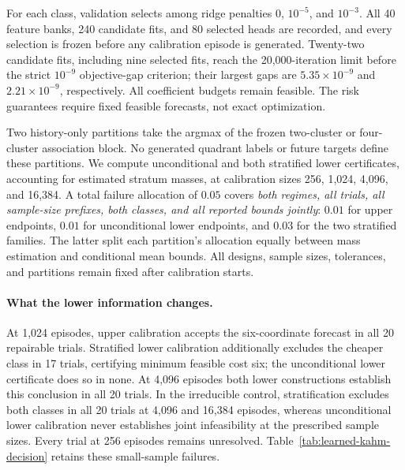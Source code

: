 For each class, validation selects among ridge penalties
$0$, $10^{-5}$, and $10^{-3}$. All 40 feature banks, 240 candidate fits, and
80 selected heads are recorded, and every selection is frozen before any
calibration episode is generated. Twenty-two candidate fits, including nine
selected fits, reach the 20,000-iteration limit before the strict $10^{-9}$
objective-gap criterion; their largest gaps are $5.35\times10^{-9}$ and
$2.21\times10^{-9}$, respectively. All coefficient budgets remain feasible.
The risk guarantees require fixed feasible forecasts, not exact optimization.

Two history-only partitions take the argmax of the frozen two-cluster or
four-cluster association block. No generated quadrant labels or future targets
define these partitions. We compute unconditional and both stratified lower
certificates, accounting for estimated stratum masses, at calibration sizes
256, 1,024, 4,096, and 16,384. A total failure allocation of $0.05$ covers
\emph{both regimes, all trials, all sample-size prefixes, both classes, and all
reported bounds jointly}: $0.01$ for upper endpoints, $0.01$ for unconditional
lower endpoints, and $0.03$ for the two stratified families. The latter split
each partition's allocation equally between mass estimation and conditional
mean bounds. All designs, sample sizes, tolerances, and partitions remain fixed
after calibration starts.



\paragraph{What the lower information changes.}
At 1,024 episodes, upper calibration accepts the six-coordinate forecast in
all 20 repairable trials. Stratified lower calibration additionally excludes
the cheaper class in 17 trials, certifying minimum feasible cost six; the
unconditional lower certificate does so in none. At 4,096 episodes both lower
constructions establish this conclusion in all 20 trials. In the irreducible
control, stratification excludes both classes in all 20 trials at 4,096 and
16,384 episodes, whereas unconditional lower calibration never establishes
joint infeasibility at the prescribed sample sizes. Every trial at 256
episodes remains unresolved. Table~\ref{tab:learned-kahm-decision} retains
these small-sample failures.

